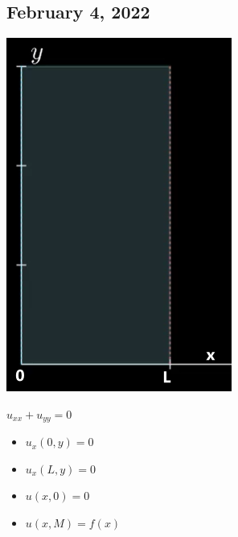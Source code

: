 \documentclass{article}
\begin{document}
\subsection*{February 4, 2022}
\begin{center}
  \includegraphics{Laplaces}

  $u_{xx} + u_{yy} = 0$
\end{center}
\begin{itemize}
  \item $u_x(0, y) = 0$
  \item $u_x(L, y) = 0$
  \item $u(x, 0) = 0$
  \item $u(x, M) = f(x)$
\end{itemize}
\end{document}
